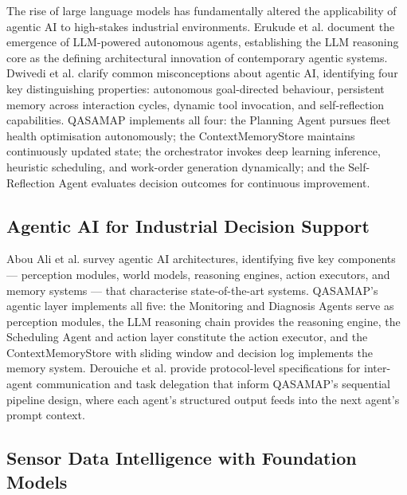 The rise of large language models has fundamentally altered the applicability of agentic AI to high-stakes industrial environments. Erukude et al. \cite{erukude_agentic_2025} document the emergence of LLM-powered autonomous agents, establishing the LLM reasoning core as the defining architectural innovation of contemporary agentic systems. Dwivedi et al. \cite{dwivedi_agentic_2026} clarify common misconceptions about agentic AI, identifying four key distinguishing properties: autonomous goal-directed behaviour, persistent memory across interaction cycles, dynamic tool invocation, and self-reflection capabilities. QASAMAP implements all four: the Planning Agent pursues fleet health optimisation autonomously; the ContextMemoryStore maintains continuously updated state; the orchestrator invokes deep learning inference, heuristic scheduling, and work-order generation dynamically; and the Self-Reflection Agent evaluates decision outcomes for continuous improvement.

\subsection{Agentic AI for Industrial Decision Support}

Abou Ali et al. \cite{AbouAli2026} survey agentic AI architectures, identifying five key components --- perception modules, world models, reasoning engines, action executors, and memory systems --- that characterise state-of-the-art systems. QASAMAP's agentic layer implements all five: the Monitoring and Diagnosis Agents serve as perception modules, the LLM reasoning chain provides the reasoning engine, the Scheduling Agent and action layer constitute the action executor, and the ContextMemoryStore with sliding window and decision log implements the memory system. Derouiche et al. \cite{derouiche_agentic_2025} provide protocol-level specifications for inter-agent communication and task delegation that inform QASAMAP's sequential pipeline design, where each agent's structured output feeds into the next agent's prompt context.

\subsection{Sensor Data Intelligence with Foundation Models}

